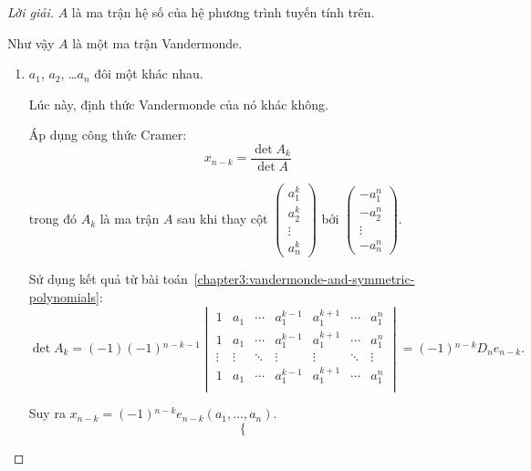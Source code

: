 \documentclass[class=linearalgebra,crop=false]{standalone}
\begin{document}
\begin{proof}[Lời giải]
    \par $A$ là ma trận hệ số của hệ phương trình tuyến tính trên.
    \par Như vậy $A$ là một ma trận Vandermonde.

    \begin{enumerate}[label = \textbf{Trường hợp \arabic*.},itemindent=2cm]
        \item $a_{1}$, $a_{2}$, \ldots $a_{n}$ đôi một khác nhau.
              \par Lúc này, định thức Vandermonde của nó khác không.
              \par Áp dụng công thức Cramer:
              \[
                  x_{n-k} = \dfrac{\det A_{k}}{\det A}
              \]
              \par trong đó $A_{k}$ là ma trận $A$ sau khi thay cột $\begin{pmatrix} a_{1}^{k} \\ a_{2}^{k} \\ \vdots \\ a_{n}^{k} \end{pmatrix}$ bởi $\begin{pmatrix}-a_{1}^{n} \\ -a_{2}^{n} \\ \vdots \\ -a_{n}^{n} \end{pmatrix}$.
              \par Sử dụng kết quả từ bài toán~\ref{chapter3:vandermonde-and-symmetric-polynomials}:
              \[
                  \det A_{k} = (-1)(-1){}^{n-k-1}
                  \begin{vmatrix}
                      1      & a_{1}  & \cdots & a_{1}^{k-1} & a_{1}^{k+1} & \cdots & a_{1}^{n} \\
                      1      & a_{1}  & \cdots & a_{1}^{k-1} & a_{1}^{k+1} & \cdots & a_{1}^{n} \\
                      \vdots & \vdots & \ddots & \vdots      & \vdots      & \ddots & \vdots    \\
                      1      & a_{1}  & \cdots & a_{1}^{k-1} & a_{1}^{k+1} & \cdots & a_{1}^{n} \\
                  \end{vmatrix}
                  = (-1){}^{n-k}D_{n}e_{n-k}.
              \]
              \par Suy ra $x_{n-k} = (-1){}^{n-k}e_{n-k}(a_{1},\ldots, a_{n})$.
              \[
                  \begin{cases}

\end{cases}\]
\end{enumerate}
\end{proof}
\end{document}

